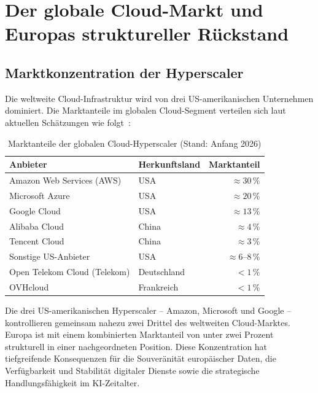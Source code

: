 ﻿\documentclass[12pt, a4paper, openany]{report}
\begin{document}
\section{Der globale Cloud-Markt und Europas struktureller Rückstand}
\label{sec:cloud_markt}

\subsection{Marktkonzentration der Hyperscaler}

Die weltweite Cloud-Infrastruktur wird von drei US-amerikanischen
Unternehmen dominiert. Die Marktanteile im globalen Cloud-Segment verteilen
sich laut aktuellen Schätzungen wie folgt~\cite{leipold2026chip}:

\begin{table}[H]
	\centering
	\caption{Marktanteile der globalen Cloud-Hyperscaler (Stand: Anfang 2026)}
	\label{tab:cloud_marktanteile}
	\begin{tabularx}{0.78\textwidth}{l l r}
		\toprule
		\textbf{Anbieter} & \textbf{Herkunftsland} & \textbf{Marktanteil} \\
		\midrule
		Amazon Web Services (AWS) & USA & $\approx 30\,\%$ \\
		Microsoft Azure            & USA & $\approx 20\,\%$ \\
		Google Cloud               & USA & $\approx 13\,\%$ \\
		\midrule
		Alibaba Cloud              & China & $\approx 4\,\%$ \\
		Tencent Cloud              & China & $\approx 3\,\%$ \\
		Sonstige US-Anbieter       & USA & $\approx 6$--$8\,\%$ \\
		\midrule
		Open Telekom Cloud (Telekom) & Deutschland & $< 1\,\%$ \\
		OVHcloud                   & Frankreich  & $< 1\,\%$ \\
		\bottomrule
	\end{tabularx}
\end{table}

\noindent
Die drei US-amerikanischen Hyperscaler -- Amazon, Microsoft und Google --
kontrollieren gemeinsam nahezu zwei Drittel des weltweiten Cloud-Marktes.
Europa ist mit einem kombinierten Marktanteil von unter zwei Prozent
strukturell in einer nachgeordneten Position. Diese Konzentration hat
tiefgreifende Konsequenzen für die Souveränität europäischer Daten, die
Verfügbarkeit und Stabilität digitaler Dienste sowie die strategische
Handlungsfähigkeit im KI-Zeitalter.
\end{document}
